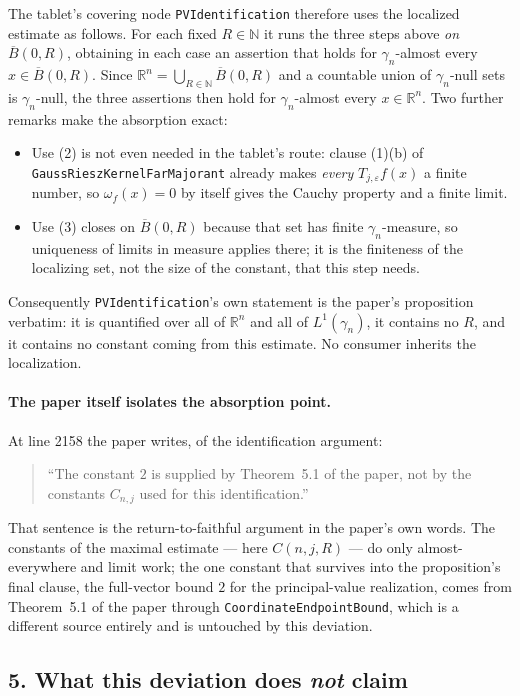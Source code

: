 The tablet's covering node \texttt{PVIdentification} therefore uses the
localized estimate as follows.  For each fixed $R \in \mathbb{N}$ it runs the
three steps above \emph{on} $\overline B(0,R)$, obtaining in each case an
assertion that holds for $\gamma_n$-almost every $x \in \overline B(0,R)$.
Since $\mathbb{R}^n = \bigcup_{R\in\mathbb{N}}\overline B(0,R)$ and a countable
union of $\gamma_n$-null sets is $\gamma_n$-null, the three assertions then hold
for $\gamma_n$-almost every $x \in \mathbb{R}^n$.  Two further remarks make the
absorption exact:
\begin{itemize}
\item Use (2) is not even needed in the tablet's route: clause (1)(b) of
\texttt{GaussRieszKernelFarMajorant} already makes \emph{every}
$T_{j,\varepsilon}f(x)$ a finite number, so $\omega_f(x) = 0$ by itself gives
the Cauchy property and a finite limit.
\item Use (3) closes on $\overline B(0,R)$ because that set has finite
$\gamma_n$-measure, so uniqueness of limits in measure applies there; it is the
finiteness of the localizing set, not the size of the constant, that this step
needs.
\end{itemize}
Consequently \texttt{PVIdentification}'s own statement is the paper's
proposition verbatim: it is quantified over all of $\mathbb{R}^n$ and all of
$L^1(\gamma_n)$, it contains no $R$, and it contains no constant coming from
this estimate.  No consumer inherits the localization.

\paragraph{The paper itself isolates the absorption point.}  At line 2158 the
paper writes, of the identification argument:
\begin{quote}
``The constant $2$ is supplied by Theorem~5.1 of the paper, not by the constants
$C_{n,j}$ used for this identification.''
\end{quote}
That sentence is the return-to-faithful argument in the paper's own words.  The
constants of the maximal estimate --- here $C(n,j,R)$ --- do only
almost-everywhere and limit work; the one constant that survives into the
proposition's final clause, the full-vector bound $2$ for the principal-value
realization, comes from Theorem~5.1 of the paper through
\texttt{CoordinateEndpointBound}, which is a different source entirely and is
untouched by this deviation.

\subsection*{5. What this deviation does \emph{not} claim}

